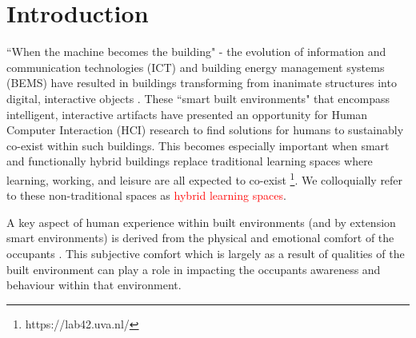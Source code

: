 \documentclass[acmconf, anonymous, review]{acmart}
\begin{document}



 
\maketitle

\section{Introduction}
``When the machine becomes the building" - the evolution of information and communication technologies (ICT) and building energy management systems (BEMS) have resulted in buildings transforming from inanimate structures into digital, interactive objects \cite{nembrini2017human}. These ``smart built environments" that encompass intelligent, interactive artifacts have presented an opportunity for Human Computer Interaction (HCI) research to find solutions for humans to sustainably co-exist within such buildings. This becomes especially important when smart and functionally hybrid buildings replace traditional learning spaces where learning, working, and leisure are all expected to co-exist \footnote{https://lab42.uva.nl/}. We colloquially refer to these non-traditional spaces as \textcolor{red}{hybrid learning spaces}. 

A key aspect of human experience within built environments (and by extension smart environments) is derived from the physical and emotional comfort of the occupants \cite{alavi2017comfort}. This subjective comfort which is largely as a result of qualities of the built environment can play a role in impacting the occupants awareness and behaviour within that environment.  
\end{document}

